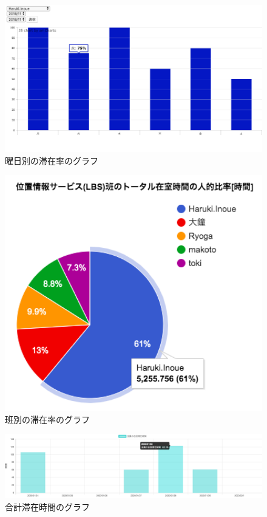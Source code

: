 \begin{figure}[H]
  \begin{center}
    \includegraphics[width=160mm]{image/StayRateWeek.png}
    \caption{曜日別の滞在率のグラフ}
    \label{fig:weekday}
  \end{center}
\end{figure}

\begin{figure}[H]
  \begin{center}
    \includegraphics[width=150mm]{image/StayRateGroup.png}
    \caption{班別の滞在率のグラフ}
    \label{fig:group}
  \end{center}
\end{figure}

\begin{figure}[H]
  \begin{center}
    \includegraphics[width=160mm]{image/TotalStayTime.png}
    \caption{合計滞在時間のグラフ}
    \label{fig:total}
  \end{center}
\end{figure}




